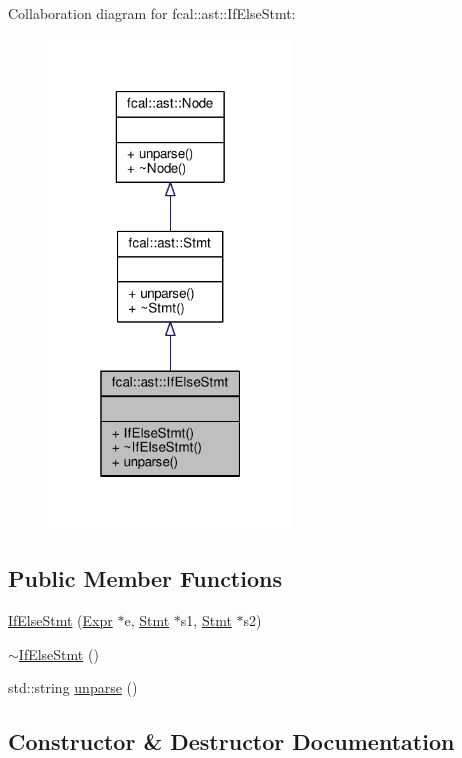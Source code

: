 Collaboration diagram for fcal\+:\+:ast\+:\+:If\+Else\+Stmt\+:
\nopagebreak
\begin{figure}[H]
\begin{center}
\leavevmode
\includegraphics[width=184pt]{classfcal_1_1ast_1_1IfElseStmt__coll__graph}
\end{center}
\end{figure}
\subsection*{Public Member Functions}
\begin{DoxyCompactItemize}
\item 
\hyperlink{classfcal_1_1ast_1_1IfElseStmt_abaf8db62e3ca16be8bfd7a563a0f0cfe}{If\+Else\+Stmt} (\hyperlink{classfcal_1_1ast_1_1Expr}{Expr} $\ast$e, \hyperlink{classfcal_1_1ast_1_1Stmt}{Stmt} $\ast$s1, \hyperlink{classfcal_1_1ast_1_1Stmt}{Stmt} $\ast$s2)
\item 
\hyperlink{classfcal_1_1ast_1_1IfElseStmt_acf5d8788769fb49588be5f4d5acef5d9}{$\sim$\+If\+Else\+Stmt} ()
\item 
std\+::string \hyperlink{classfcal_1_1ast_1_1IfElseStmt_a58584903e7e9480773ca5be804342721}{unparse} ()
\end{DoxyCompactItemize}


\subsection{Constructor \& Destructor Documentation}
